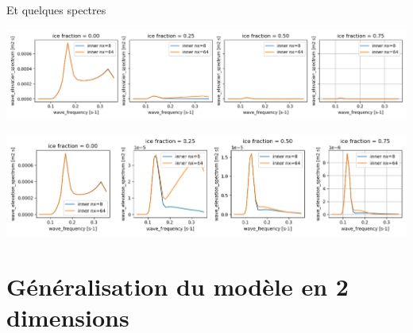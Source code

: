 \documentclass[10pt]{article}
\numberwithin{equation}{section}
\begin{document}
Et quelques spectres

\begin{center}
\includegraphics[width=.9\linewidth]{Figures/figures/analyse_spec_ww3_003.png}
\end{center}
\begin{center}
\includegraphics[width=.9\linewidth]{Figures/figures/analyse_spec_ww3_004.png}
\end{center}
\section{Généralisation du modèle en 2 dimensions}
\label{sec:org49793ad}



\end{document}
